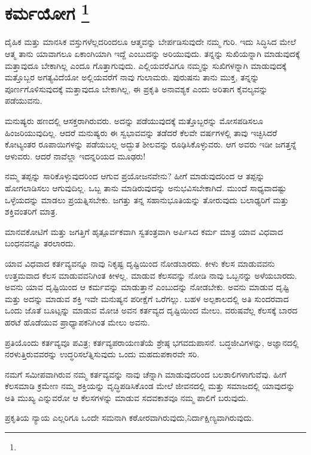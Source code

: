 
\vskip -0.5cm

\chapter[ಕರ್ಮಯೋಗ ]{ಕರ್ಮಯೋಗ \protect\footnote{}}

ದೈಹಿಕ ಮತ್ತು ಮಾನಸಿಕ ವಸ್ತುಗಳೆಲ್ಲದರಿಂದಲೂ ಆತ್ಮವನ್ನು ಬೇರ್ಪಡಿಸುವುದೇ ನಮ್ಮ ಗುರಿ. ಇದು ಸಿದ್ಧಿಸಿದ ಮೇಲೆ ಆತ್ಮ ತಾನು ಯಾವಾಗಲೂ ಏಕಾಂಗಿಯಾಗಿ ಇದ್ದೆ ಎಂಬುದನ್ನು ಅರಿಯುವುದು. ತನ್ನನ್ನು ಸುಖಿಯನ್ನಾಗಿ ಮಾಡುವುದಕ್ಕೆ ಮತ್ತಾವುದೂ ಬೇಕಾಗಿಲ್ಲ ಎಂದೂ ಗೊತ್ತಾಗುವುದು. ಎಲ್ಲಿಯವರೆವಿಗೂ ನಮ್ಮನ್ನು ಸುಖಿಗಳನ್ನಾಗಿ ಮಾಡುವುದಕ್ಕೆ ಮತ್ತೊಬ್ಬರ ಅಗತ್ಯವಿದೆಯೋ ಅಲ್ಲಿಯವರೆಗೆ ನಾವು ಗುಲಾಮರು. ಪುರುಷನು ತಾನು ಮುಕ್ತ, ತನ್ನನ್ನು ಪೂರ್ಣಗೊಳಿಸುವುದಕ್ಕೆ ಮತ್ತಾವುದೂ ಬೇಕಾಗಿಲ್ಲ, ಈ ಪ್ರಕೃತಿ ಅನಾವಶ್ಯಕ ಎಂದು ಅರಿತಾಗ ಕೈವಲ್ಯವನ್ನು ಪಡೆಯುವನು.

ಮನುಷ್ಯರು ಹಣದಲ್ಲಿ ಆಸಕ್ತರಾಗಿರುವರು. ಅದನ್ನು ಪಡೆಯುವುದಕ್ಕೆ ಮತ್ತೊಬ್ಬರನ್ನು ಮೋಸಪಡಿಸಲೂ ಹಿಂಜರಿಯುವುದಿಲ್ಲ. ಆದರೆ ಮನುಷ್ಯರು ಈ ಸ್ವಭಾವವನ್ನು ತಡೆದರೆ ಕೆಲವೇ ವರ್ಷಗಳಲ್ಲಿ ತಾವು ಇಚ್ಛಿಸಿದರೆ ಕೋಟ್ಯಂತರ ರೂಪಾಯಿಗಳನ್ನು ಪಡೆಯಬಲ್ಲ ಅದ್ಭುತ ಶೀಲವನ್ನು ರೂಢಿಸಿಕೊಳ್ಳುವರು. ಆಗ ಅವರು ಇಡೀ ಜಗತ್ತನ್ನೆ ಆಳುವರು. ಆದರೆ ನಾವೆಲ್ಲಾ ಇದನ್ನರಿಯದ ಮೂಢರು!

ನಮ್ಮ ತಪ್ಪನ್ನು ಸಾರಿಕೊಳ್ಳುವುದರಿಂದ ಆಗುವ ಪ್ರಯೋಜನವೇನು? ಹೀಗೆ ಮಾಡುವುದರಿಂದ ಆ ತಪ್ಪನ್ನು ಹೋಗಲಾಡಿಸಲು ಆಗುವುದಿಲ್ಲ. ಒಬ್ಬ ತಾನು ಮಾಡಿರುವುದನ್ನು ಅನುಭವಿಸಬೇಕಾಗಿದೆ. ಮುಂದೆ ಸಾಧ್ಯವಾದಷ್ಟು ಒಳ್ಳೆಯದನ್ನು ಮಾಡಲು ಪ್ರಯತ್ನಿಸಬೇಕು. ಜಗತ್ತು ತನ್ನ ಸಹಾನುಭೂತಿಯನ್ನು ತೋರುವುದು ಬಲಾಢ್ಯರಿಗೆ ಮತ್ತು ಶಕ್ತಿವಂತರಿಗೆ ಮಾತ್ರ.

ಮಾನವಕೋಟಿಗೆ ಮತ್ತು ಜಗತ್ತಿಗೆ ಹೃತ್ಪೂರ್ವಕವಾಗಿ ಸ್ವತಂತ್ರವಾಗಿ ಅರ್ಪಿಸಿದ ಕರ್ಮ ಮಾತ್ರ ಯಾವ ವಿಧವಾದ ಬಂಧನವನ್ನೂ ತರಲಾರದು.

ಯಾವ ವಿಧವಾದ ಕರ್ತವ್ಯವನ್ನೂ ನಾವು ನಿಕೃಷ್ಟ ದೃಷ್ಟಿಯಿಂದ ನೋಡಬಾರದು. ಕೀಳು ಕೆಲಸ ಮಾಡುವವನು ಉತ್ತಮವಾದ ಕೆಲಸ ಮಾಡುವವನಿಗಿಂತ ಕೀಳಲ್ಲ. ಮಾಡುವ ಕೆಲಸವನ್ನು ನೋಡಿ ನಾವು ಒಬ್ಬನನ್ನು ಅಳೆಯಬಾರದು. ಅವನು ಯಾವ ದೃಷ್ಟಿಯಿಂದ ಆ ಕರ್ಮವನ್ನು ಮಾಡುತ್ತಾನೆ ಎಂಬುದನ್ನು ನೋಡಬೇಕು. ಅವನು ಮಾಡುವ ದೃಷ್ಟಿ ಮತ್ತು ಅದನ್ನು ಮಾಡುವ ಶಕ್ತಿ ಇವೇ ಮನುಷ್ಯನ ಪರೀಕ್ಷೆಗೆ ಒರೆಗಲ್ಲು. ಬಹಳ ಅಲ್ಪಕಾಲದಲ್ಲಿ ಅತಿ ಸುಂದರವಾದ ಒಂದು ಜೊತೆ ಬೂಟ್ಸನ್ನು ಮಾಡುವ ಮೋಚಿ ಅವನ ಕರ್ತವ್ಯದ ದೃಷ್ಟಿಯಿಂದ ಮೇಲು. ವರುಷವೆಲ್ಲ ಕೆಲಸಕ್ಕೆ ಬಾರದ ಹರಟೆ ಹೊಡೆಯುವ ಪ್ರಾಧ್ಯಾಪಕನಿಗಿಂತ ಮೇಲು ಅವನು.

ಪ್ರತಿಯೊಂದು ಕರ್ತವ್ಯವೂ ಪವಿತ್ರ; ಕರ್ತವ್ಯಪರಾಯಣತೆಯೆ ಶ್ರೇಷ್ಠ ಭಗವದುಪಾಸನೆ. ಬದ್ಧಜೀವಿಗಳನ್ನು, ಅಜ್ಞಾನದಲ್ಲಿ ನರಳುತ್ತಿರುವವರನ್ನು ಉದ್ಧರಿಸಲೆತ್ನಿಸುವುದು ಒಂದು ಮಹದುಪಕಾರವೇ ಸರಿ.

ನಮಗೆ ಸಮೀಪವಾಗಿರುವ ನಮ್ಮ ಕರ್ತವ್ಯವನ್ನು ನಾವು ಚೆನ್ನಾಗಿ ಮಾಡುವುದರಿಂದ ಬಲಶಾಲಿಗಳಾಗುವೆವು. ಹೀಗೆ ಕೆಲಸಮಾಡಿ ಕ್ರಮೇಣ ನಮ್ಮ ಶಕ್ತಿಯನ್ನು ವೃದ್ಧಿಪಡಿಸಿಕೊಂಡ ಮೇಲೆ ಜೀವನದಲ್ಲಿ ಮತ್ತು ಸಮಾಜದಲ್ಲಿ ಯಾವುದನ್ನು ಅತಿ ಮುಖ್ಯ ಎನ್ನುವರೋ ಆ ಕೆಲಸಗಳನ್ನು ಮಾಡುವ ಸದವಕಾಶವೂ ನಮ್ಮ ಪಾಲಿಗೆ ಬರುವುದು.

ಪ್ರಕೃತಿಯ ನ್ಯಾಯ ಎಲ್ಲರಿಗೂ ಒಂದೇ ಸಮನಾಗಿ ಕಠೋರವಾಗಿರುವುದು,\break ನಿರ್ದಾಕ್ಷಿಣ್ಯವಾಗಿರುವುದು.

